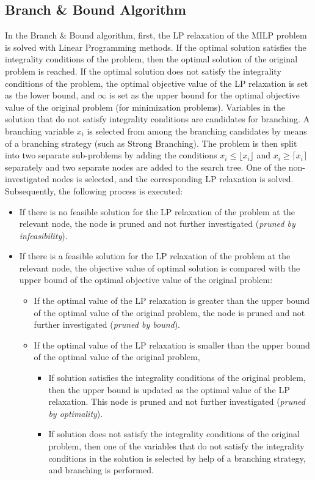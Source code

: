 \subsection{Branch \& Bound Algorithm}\label{subsec:branch-bound-algorithm}
In the Branch \& Bound algorithm, first, the LP relaxation of the MILP problem is solved with Linear Programming methods.
If the optimal solution satisfies the integrality conditions of the problem, then the optimal solution of the original problem is reached.
If the optimal solution does not satisfy the integrality conditions of the problem, the optimal objective value of the LP relaxation is set as the lower bound, and $\infty$ is set as the upper bound for the optimal objective value of the original problem (for minimization problems).
Variables in the solution that do not satisfy integrality conditions are candidates for branching.
A branching variable $x_i$ is selected from among the branching candidates by means of a branching strategy (such as Strong Branching).
The problem is then split into two separate sub-problems by adding the conditions $x_i \leq \lfloor x_i \rfloor$ and $x_i \geq \lceil x_i \rceil$ separately and two separate nodes are added to the search tree.
One of the non-investigated nodes is selected, and the corresponding LP relaxation is solved.
Subsequently, the following process is executed:

\begin{itemize}
  \item If there is no feasible solution for the LP relaxation of the problem at the relevant node, the node is pruned and not further investigated (\textit{pruned by infeasibility}).
  \item If there is a feasible solution for the LP relaxation of the problem at the relevant node, the objective value of optimal solution is compared with the upper bound of the optimal objective value of the original problem:
  \begin{itemize}
    \item If the optimal value of the LP relaxation is greater than the upper bound of the optimal value of the original problem, the node is pruned and not further investigated (\textit{pruned by bound}).
    \item If the optimal value of the LP relaxation is smaller than the upper bound of the optimal value of the original problem,
      \begin{itemize}
          \item If solution satisfies the integrality conditions of the original problem, then the upper bound is updated as the optimal value of the LP relaxation.
          This node is pruned and not further investigated (\textit{pruned by optimality}).
          \item If solution does not satisfy the integrality conditions of the original problem, then one of the variables that do not satisfy the integrality conditions in the solution is selected by help of a branching strategy, and branching is performed.
          \end{itemize}
  \end{itemize}
\end{itemize}

